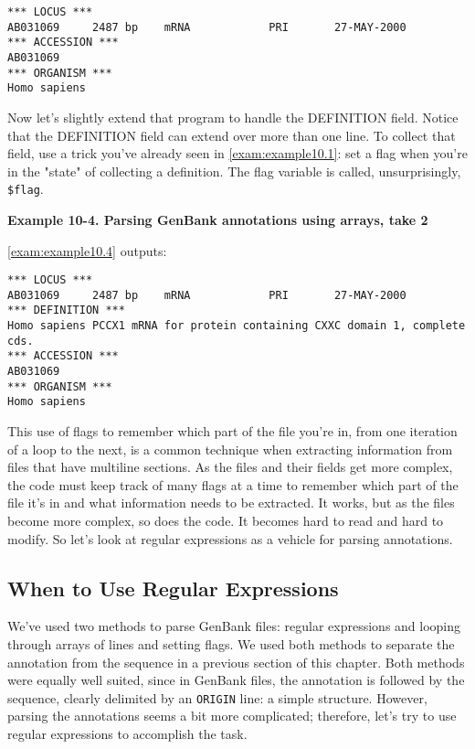 \begin{lstlisting}
*** LOCUS ***
AB031069     2487 bp    mRNA            PRI       27-MAY-2000
*** ACCESSION ***
AB031069
*** ORGANISM ***
Homo sapiens
\end{lstlisting}

Now let's slightly extend that program to handle the DEFINITION field.  Notice that the DEFINITION field can extend over more than one line. To collect that field, use a trick you've already seen in \autoref{exam:example10.1}: set a flag when you're in the "state" of collecting a definition. The flag variable is called, unsurprisingly, \verb|$flag|. 

\textbf{Example 10-4. Parsing GenBank annotations using arrays, take 2}


\autoref{exam:example10.4} outputs:

\begin{lstlisting}
*** LOCUS ***
AB031069     2487 bp    mRNA            PRI       27-MAY-2000
*** DEFINITION ***
Homo sapiens PCCX1 mRNA for protein containing CXXC domain 1, complete
cds.
*** ACCESSION ***
AB031069
*** ORGANISM ***
Homo sapiens
\end{lstlisting}

This use of flags to remember which part of the file you're in, from one iteration of a loop to the next, is a common technique when extracting information from files that have multiline sections. As the files and their fields get more complex, the code must keep track of many flags at a time to remember which part of the file it's in and what information needs to be extracted. It works, but as the files become more complex, so does the code. It becomes hard to read and hard to modify. So let's look at regular expressions as a vehicle for parsing annotations. 

\subsection{When to Use Regular Expressions}
We've used two methods to parse GenBank files: regular expressions and looping through arrays of lines and setting flags. We used both methods to separate the annotation from the sequence in a previous section of this chapter. Both methods were equally well suited, since in GenBank files, the annotation is followed by the sequence, clearly delimited by an \verb|ORIGIN| line: a simple structure. However, parsing the annotations seems a bit more complicated; therefore, let's try to use regular expressions to accomplish the task.


